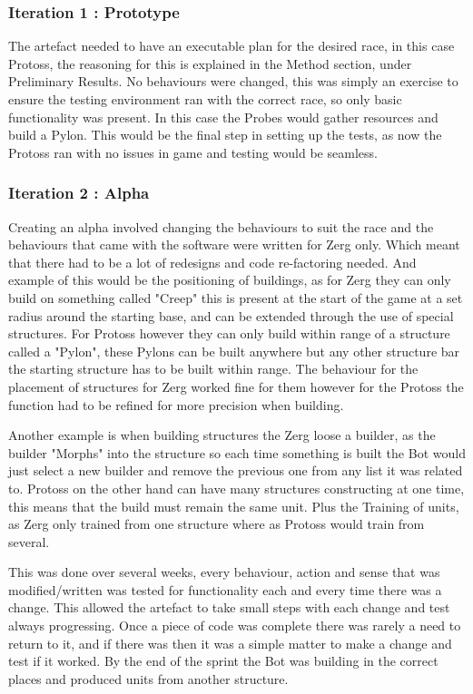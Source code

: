 \documentclass[journal]{IEEEtran}
\begin{document}
\subsubsection{Iteration 1 : Prototype}
The artefact needed to have an executable plan for the desired race, in this case Protoss, the reasoning for this is explained in the Method section, under Preliminary Results. No behaviours were changed, this was simply an exercise to ensure the testing environment ran with the correct race, so only basic functionality was present. In this case the Probes would gather resources and build a Pylon. This would be the final step in setting up the tests, as now the Protoss ran with no issues in game and testing would be seamless.
\newline

\subsubsection{Iteration 2 : Alpha}
Creating an alpha involved changing the behaviours to suit the race and the behaviours that came with the software were written for Zerg only. Which meant that there had to be a lot of redesigns and code re-factoring needed. And example of this would be the positioning of buildings, as for Zerg they can only build on something called "Creep" this is present at the start of the game at a set radius around the starting base, and can be extended through the use of special structures. For Protoss however they can only build within range of a structure called a "Pylon", these Pylons can be built anywhere but any other structure bar the starting structure has to be built within range. The behaviour for the placement of structures for Zerg worked fine for them however for the Protoss the function had to be refined for more precision when building. 

Another example is when building structures the Zerg loose a builder, as the builder "Morphs" into the structure so each time something is built the Bot would just select a new builder and remove the previous one from any list it was related to. Protoss on the other hand can have many structures constructing at one time, this means that the build must remain the same unit. Plus the Training of units, as Zerg only trained from one structure where as Protoss would train from several.

This was done over several weeks, every behaviour, action and sense that was modified/written was tested for functionality each and every time there was a change. This allowed the artefact to take small steps with each change and test always progressing. Once a piece of code was complete there was rarely a need to return to it, and if there was then it was a simple matter to make a change and test if it worked. By the end of the sprint the Bot was building in the correct places and produced units from another structure.
\newline
\end{document}
